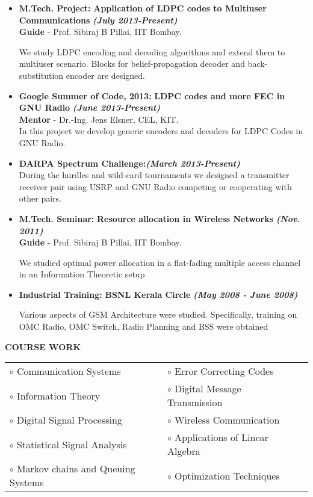 \documentclass[a4paper,10pt]{article}
\begin{document}
    \begin{itemize}
    \setlength{\itemsep}{1pt}
    \item \textbf{M.Tech. Project:} \textbf{Application of LDPC codes to Multiuser Communications} \textbf \emph{(July 2013-Present)} \\
    {\textbf{Guide} - Prof. Sibiraj B Pillai, IIT Bombay.}

      We study LDPC encoding and decoding algorithms and extend them to multiuser scenario.
      Blocks for belief-propagation decoder and back-substitution encoder are designed.

    \item \textbf{Google Summer of Code, 2013:} \textbf{LDPC codes and more FEC in GNU Radio}  \textbf \emph{(June 2013-Present)}\\
    {\textbf{Mentor} - Dr.-Ing. Jens Elsner, CEL, KIT.} \\
      In this project we develop generic encoders and decoders for LDPC Codes in GNU Radio.
      
    \item \textbf{DARPA Spectrum Challenge:}\textbf \emph{(March 2013-Present)} \\
      During the hurdles and wild-card tournaments we designed a transmitter receiver pair using USRP and GNU Radio competing or cooperating with other pairs.
        
    \item \textbf{M.Tech. Seminar:} \textbf{Resource allocation in Wireless Networks}  \textbf \emph{(Nov. 2011)}\\
    {\textbf{Guide} - Prof. Sibiraj B Pillai, IIT Bombay.   }

       We studied optimal power allocation in a flat-fading multiple access channel in an Information Theoretic setup

    \item \textbf{Industrial Training:} \textbf{BSNL Kerala Circle}  \textbf \emph{(May 2008 - June 2008)}

      Various aspects of GSM Architecture were studied. Specifically, training on OMC Radio, OMC Switch, Radio Planning and BSS were 
      obtained

    \end{itemize}

 \colorbox{titleColor}{\parbox{6.5in}{\textbf{COURSE WORK}}}
 
 \begin{tabular}{p{3.5in}p{5in}p{3.5in}}
    $\circ$ Communication Systems		&$\circ$ Error Correcting Codes \\
    $\circ$ Information Theory			&$\circ$ Digital Message Transmission \\
    $\circ$ Digital Signal Processing		&$\circ$ Wireless Communication \\
    $\circ$ Statistical Signal Analysis	&$\circ$ Applications of Linear Algebra \\
    $\circ$ Markov chains and Queuing Systems	&$\circ$ Optimization Techniques \\
\end{tabular}
\end{document}
